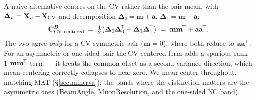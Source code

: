 A naive alternative centres on the CV rather than the pair mean, with
$\boldsymbol{\Delta}_{u} = \mathbf{X}_{u}-\mathbf{X}_{\text{CV}}$ and decomposition
$\boldsymbol{\Delta}_{0}=\mathbf{m}+\mathbf{a}$,
$\boldsymbol{\Delta}_{1}=\mathbf{m}-\mathbf{a}$:
\begin{equation}
\mathbf{C}^{B}_{\text{CV-centered}}
\;=\;
\tfrac{1}{2}\big(\boldsymbol{\Delta}_{0}\boldsymbol{\Delta}_{0}^{\!\top}
                + \boldsymbol{\Delta}_{1}\boldsymbol{\Delta}_{1}^{\!\top}\big)
\;=\;
\mathbf{m}\mathbf{m}^{\!\top} + \mathbf{a}\mathbf{a}^{\!\top}.
\end{equation}
The two agree \emph{only} for a CV-symmetric pair ($\mathbf{m}=0$),
where both reduce to $\mathbf{a}\mathbf{a}^{\!\top}$. For an asymmetric or
one-sided pair the CV-centered form adds a spurious rank-1
$\mathbf{m}\mathbf{m}^{\!\top}$ term --- it treats the common offset as a second
variance direction, which mean-centering correctly collapses to near
zero. We mean-center throughout, matching MAT (\S\ref{sec:minerva}); the
bands where the distinction matters are the asymmetric ones (BeamAngle,
MuonResolution, and the one-sided NC band).

